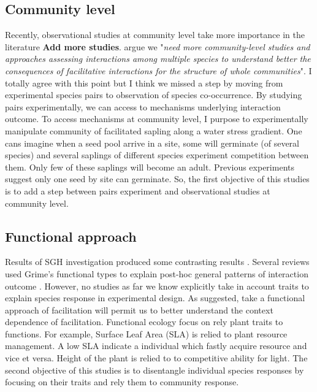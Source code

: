 \documentclass[12pt]{article} %
\begin{document}
\subsection{Community level}
Recently, observational studies at community level take more importance in the literature \citep{Soliveres2012, Gross2013, Soliveres2014b} \textbf{Add more studies}. 
\citet{Soliveres2014} argue we "\textit{need more community-level studies and approaches assessing interactions among multiple species to understand better the consequences of facilitative interactions for the structure of whole communities}". 
I totally agree with this point but I think we missed a step by moving from experimental species pairs to observation of species co-occurrence. By studying pairs experimentally, we can access to mechanisms underlying interaction outcome. 
To access mechanisms at community level, I purpose to experimentally manipulate community of facilitated sapling along a water stress gradient.
One cans imagine when a seed pool arrive in a site, some will germinate (of several species) and several saplings of different species experiment competition between them. Only few of these saplings will become an adult. Previous experiments suggest only one seed by site can germinate. So, the first objective of this studies is to add a step between pairs experiment and observational studies at community level.


\subsection{Functional approach}
Results of SGH investigation produced some contrasting results \citep{Maestre2009}. Several reviews used Grime's functional types to explain post-hoc general patterns of interaction outcome \citep{Maestre2009,Butterfield2013}. %
However, no studies as far we know explicitly take in account traits to explain species response in experimental design. As \citet{Butterfield2013} suggested, take a functional approach of facilitation will permit us to better understand the context dependence of facilitation. Functional ecology focus on rely plant traits to functions. For example, Surface Leaf Area (SLA) is relied to plant resource management. A low SLA indicate a individual which fastly acquire resource and vice et versa. Height of the plant is relied to to competitive ability for light. The second objective of this studies is to disentangle individual species responses by focusing on their traits and rely them to community response. 
\end{document}
